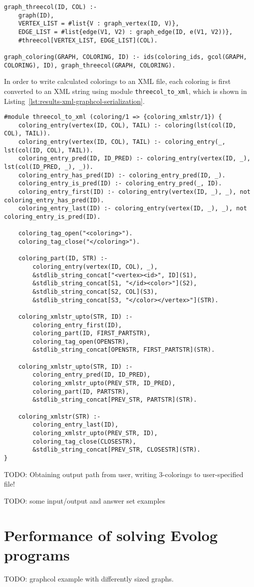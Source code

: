 \begin{lstlisting}[style=asp-code, label={lst:results-xml-graphcol-colorings}, caption={Calculating graph colorings.}]
graph_threecol(ID, COL) :- 
	graph(ID), 
	VERTEX_LIST = #list{V : graph_vertex(ID, V)}, 
	EDGE_LIST = #list{edge(V1, V2) : graph_edge(ID, e(V1, V2))}, 
	#threecol[VERTEX_LIST, EDGE_LIST](COL).

graph_coloring(GRAPH, COLORING, ID) :- ids(coloring_ids, gcol(GRAPH, COLORING), ID), graph_threecol(GRAPH, COLORING).    
\end{lstlisting}    

In order to write calculated colorings to an XML file, each coloring is first converted to an XML string using module \texttt{threecol\_to\_xml}, which is shown in Listing~\ref{lst:results-xml-graphcol-serialization}.

\begin{lstlisting}[style=asp-code, label={lst:results-xml-graphcol-serialization}, caption={Generating XML strings for graph colorings.}]
#module threecol_to_xml (coloring/1 => {coloring_xmlstr/1}) {
    coloring_entry(vertex(ID, COL), TAIL) :- coloring(lst(col(ID, COL), TAIL)).
    coloring_entry(vertex(ID, COL), TAIL) :- coloring_entry(_, lst(col(ID, COL), TAIL)).
    coloring_entry_pred(ID, ID_PRED) :- coloring_entry(vertex(ID, _), lst(col(ID_PRED, _), _)).
    coloring_entry_has_pred(ID) :- coloring_entry_pred(ID, _).
    coloring_entry_is_pred(ID) :- coloring_entry_pred(_, ID).
    coloring_entry_first(ID) :- coloring_entry(vertex(ID, _), _), not coloring_entry_has_pred(ID).
    coloring_entry_last(ID) :- coloring_entry(vertex(ID, _), _), not coloring_entry_is_pred(ID).

    coloring_tag_open("<coloring>").
    coloring_tag_close("</coloring>").

    coloring_part(ID, STR) :- 
        coloring_entry(vertex(ID, COL), _), 
        &stdlib_string_concat["<vertex><id>", ID](S1),
        &stdlib_string_concat[S1, "</id><color>"](S2),
        &stdlib_string_concat[S2, COL](S3),
        &stdlib_string_concat[S3, "</color></vertex>"](STR).

    coloring_xmlstr_upto(STR, ID) :- 
        coloring_entry_first(ID), 
        coloring_part(ID, FIRST_PARTSTR),
        coloring_tag_open(OPENSTR),
        &stdlib_string_concat[OPENSTR, FIRST_PARTSTR](STR).

    coloring_xmlstr_upto(STR, ID) :- 
        coloring_entry_pred(ID, ID_PRED),
        coloring_xmlstr_upto(PREV_STR, ID_PRED),
        coloring_part(ID, PARTSTR),
        &stdlib_string_concat[PREV_STR, PARTSTR](STR).
        
    coloring_xmlstr(STR) :- 
        coloring_entry_last(ID),
        coloring_xmlstr_upto(PREV_STR, ID),
        coloring_tag_close(CLOSESTR),
        &stdlib_string_concat[PREV_STR, CLOSESTR](STR).	    
} 
\end{lstlisting}  

TODO: Obtaining output path from user, writing 3-colorings to user-specified file!

TODO: some input/output and answer set examples

\section{Performance of solving Evolog programs}

TODO: graphcol example with differently sized graphs.